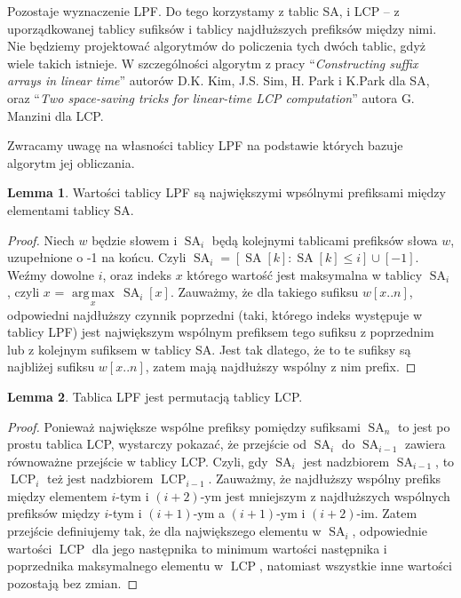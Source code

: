 \documentclass[a4paper,12pt]{article}
\theoremstyle{definition}
\newtheorem{lemma}{Lemma}[section]
\DeclareMathOperator{\SA}{SA}
\DeclareMathOperator{\LCP}{LCP}
\DeclareMathOperator*{\argmax}{arg\,max}
\begin{document}
Pozostaje wyznaczenie LPF. Do tego korzystamy z tablic SA, i LCP --
 z uporządkowanej tablicy sufiksów i tablicy najdłuższych prefiksów między nimi.
Nie będziemy projektować algorytmów do policzenia tych dwóch tablic,
 gdyż wiele takich istnieje.
W szczególności algorytm 
 z pracy ``\textit{Constructing suffix arrays in linear time}'' autorów D.K. Kim, J.S. Sim, H. Park i K.Park dla SA,
 oraz ``\textit{Two space-saving tricks for linear-time LCP computation}'' autora G. Manzini dla LCP.

Zwracamy uwagę na własności tablicy LPF na podstawie których bazuje algorytm jej obliczania.

\begin{lemma}

Wartości tablicy LPF są największymi wpsólnymi prefiksami między elementami tablicy SA.

\begin{proof}

Niech $w$ będzie słowem i $\SA_{i}$ będą kolejnymi tablicami prefiksów słowa $w$, uzupełnione o -1 na końcu.
Czyli $\SA_{i} = [ \SA[k] : \SA[k] \leq i ] \cup [-1]$.
Weźmy dowolne $i$, oraz indeks $x$ którego wartość jest maksymalna w tablicy $\SA_{i}$,
 czyli $x$ = $\argmax\limits_{x} \, \SA_{i}[x]$.
Zauważmy, że dla takiego sufiksu $w[x .. n]$, odpowiedni najdłuższy czynnik poprzedni (taki, którego indeks występuje w tablicy LPF)
 jest największym wspólnym prefiksem tego sufiksu z poprzednim lub z kolejnym sufiksem w tablicy SA.
Jest tak dlatego, że to te sufiksy są najbliżej sufiksu $w[x .. n]$, zatem mają najdłuższy wspólny z nim prefix.

\end{proof}
\end{lemma}

\begin{lemma}

Tablica LPF jest permutacją tablicy LCP.

\begin{proof}

Ponieważ największe wspólne prefiksy pomiędzy sufiksami $\SA_{n}$ to jest po prostu tablica LCP,
 wystarczy pokazać, że przejście od $\SA_{i}$ do $\SA_{i - 1}$ zawiera równoważne przejście w tablicy LCP.
Czyli, gdy $\SA_{i}$ jest nadzbiorem $\SA_{i - 1}$, to $\LCP_{i}$ też jest nadzbiorem $\LCP_{i - 1}$.
Zauważmy, że najdłuższy wspólny prefiks między elementem $i$-tym i $(i + 2)$-ym
 jest mniejszym z najdłuższych wspólnych prefiksów między $i$-tym i $(i + 1)$-ym a $(i + 1)$-ym i $(i + 2)$-im.
Zatem przejście definiujemy tak, że dla największego elementu w $\SA_{i}$, odpowiednie wartości $\LCP$ dla jego następnika
 to minimum wartości następnika i poprzednika maksymalnego elementu w $\LCP$, natomiast wszystkie inne wartości pozostają bez zmian.

\end{proof}
\end{lemma}
\end{document}
